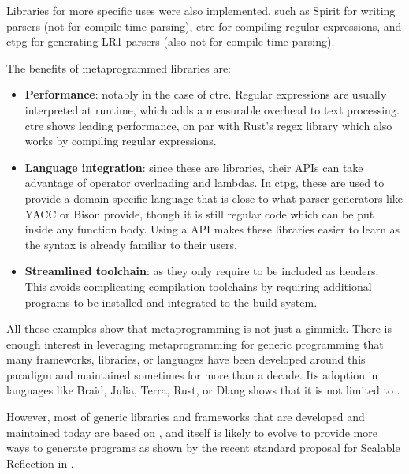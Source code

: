 \documentclass[../main]{subfiles}
\begin{document}

Libraries for more specific uses were also implemented, such as
Spirit\cite{spirit} for writing parsers (not for compile time parsing),
\gls{ctre} \cite{ctre} for compiling regular expressions,
and \gls{ctpg} \cite{ctpg} for generating LR1 parsers
(also not for compile time parsing).


The benefits of metaprogrammed libraries are:

\begin{itemize}

\item \textbf{Performance}: notably in the case of \gls{ctre}.
Regular expressions are usually interpreted at runtime,
which adds a measurable overhead to text processing.
\gls{ctre} shows leading performance, on par with Rust's regex library
which also works by compiling regular expressions.

\item \textbf{Language integration}: since these are \cpp libraries,
their APIs can take advantage of \cpp operator overloading and lambdas.
In \gls{ctpg}, these are used to provide a domain-specific language that is close to
what parser generators like YACC or Bison provide,
though it is still regular \cpp code which can be put inside any function body.
Using a \cpp API makes these libraries easier to learn
as the syntax is already familiar to their users.

\item \textbf{Streamlined toolchain}: as they only require to be included as headers.
This avoids complicating compilation toolchains by requiring additional programs
to be installed and integrated to the build system.

\end{itemize}

All these examples show that metaprogramming is not just a gimmick.
There is enough interest in leveraging metaprogramming
for generic programming that many frameworks, libraries, or languages
have been developed around this paradigm and maintained sometimes
for more than a decade. Its adoption in languages like Braid, Julia, Terra,
Rust, or Dlang shows that it is not limited to \cpp.

However, most of generic libraries and frameworks that are developed
and maintained today are based on \cpp, and \cpp itself is likely to
evolve to provide more ways to generate programs as shown by the recent
standard proposal for Scalable Reflection in \cpp \cite{scalable-reflection}.
\end{document}
